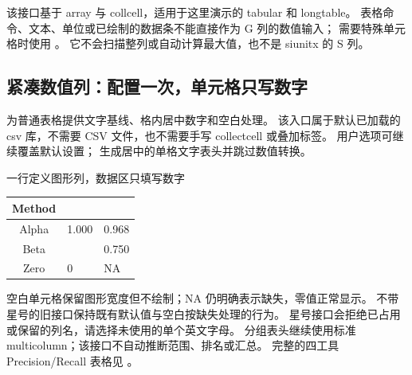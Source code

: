 该接口基于 array 与 collcell，适用于这里演示的 tabular 和 longtable。
表格命令、文本、单位或已绘制的数据条不能直接作为 G 列的数值输入；
需要特殊单元格时使用 。
它不会扫描整列或自动计算最大值，也不是 siunitx 的 S 列。


\subsection{紧凑数值列：配置一次，单元格只写数字}
 为普通表格提供文字基线、格内居中数字和空白处理。
该入口属于默认已加载的 csv 库，不需要 CSV 文件，也不需要手写 collectcell 或叠加标签。
用户选项可继续覆盖默认设置； 生成居中的单格文字表头并跳过数值转换。
\begin{example}[text and listing,sidebyside=false]{一行定义图形列，数据区只填写数字}
\begin{center}
\begin{tabular}{@{}cGG@{}}
\toprule
Method &  & \\\midrule
Alpha & 1.000 & 0.968\\
Beta & & 0.750\\
Zero & 0 & NA\\\bottomrule
\end{tabular}
\end{center}
\end{example}
空白单元格保留图形宽度但不绘制；NA 仍明确表示缺失，零值正常显示。
不带星号的旧接口保持既有默认值与空白按缺失处理的行为。
星号接口会拒绝已占用或保留的列名，请选择未使用的单个英文字母。
分组表头继续使用标准 multicolumn；该接口不自动推断范围、排名或汇总。
完整的四工具 Precision/Recall 表格见 。
